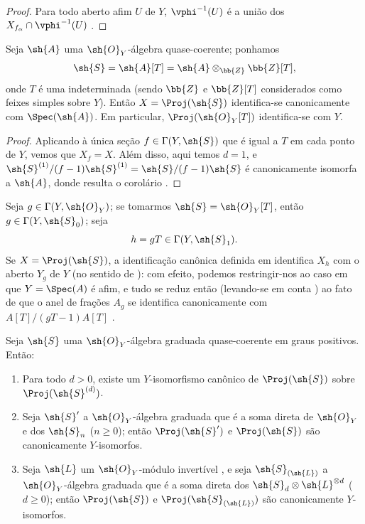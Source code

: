 \documentclass[oneside,10pt]{amsart}
\renewcommand{\geq}{\geqslant}
\newcommand{\oldpage}[2][]{\marginnote{\normalfont\footnotesize\textbf{#1}~|~#2}\ignorespaces}
\let\EGAOriginalLabel\label
\renewcommand{\label}[1]{\phantomsection\EGAOriginalLabel{#1}}
\begin{document}
\begin{proof}
Para todo aberto afim $U$ de $Y$, $\vphi^{-1}(U)$ é a união dos $X_{f_\alpha}\cap\vphi^{-1}(U)$ .
\end{proof}

\begin{corollary}[3.1.7]
\label{II.3.1.7}
Seja $\sh{A}$ uma $\sh{O}_Y$-álgebra quase-coerente;
ponhamos
\[
  \sh{S}=\sh{A}[T]=\sh{A}\otimes_{\bb{Z}}\bb{Z}[T],
\]
onde $T$ é uma indeterminada (sendo $\bb{Z}$ e $\bb{Z}[T]$ considerados como feixes simples sobre $Y$).
Então $X=\Proj(\sh{S})$ identifica-se canonicamente com $\Spec(\sh{A})$.
Em particular, $\Proj(\sh{O}_Y[T])$ identifica-se com $Y$.
\end{corollary}

\begin{proof}
Aplicando  à única seção $f\in\Gamma(Y,\sh{S})$ que é igual a $T$ em cada ponto de $Y$, vemos que $X_f=X$.
Além disso, aqui temos $d=1$, e $\sh{S}^{(1)}/(f-1)\sh{S}^{(1)}=\sh{S}/(f-1)\sh{S}$ é canonicamente isomorfa a $\sh{A}$, donde resulta o corolário .
\end{proof}

Seja $g\in\Gamma(Y,\sh{O}_Y)$;
se tomarmos $\sh{S}=\sh{O}_Y[T]$, então $g\in\Gamma(Y,\sh{S}_0)$;
seja
\[
  h=gT\in\Gamma(Y,\sh{S}_1).
\]
Se $X=\Proj(\sh{S})$, a identificação canônica definida em  identifica $X_h$ com o aberto $Y_g$ de $Y$ (no sentido de ):
com efeito, podemos restringir-nos ao caso em que $Y=\Spec(A)$ é afim, e tudo se reduz então (levando-se em conta ) ao fato de que o anel de frações $A_g$ se identifica canonicamente com $A[T]/(gT-1)A[T]$ .

\begin{proposition}[3.1.8]
\label{II.3.1.8}
Seja $\sh{S}$ uma $\sh{O}_Y$-álgebra graduada quase-coerente em graus positivos.
Então:
\begin{enumerate}
  \item[(i)] Para todo $d>0$, existe um $Y$-isomorfismo canônico de $\Proj(\sh{S})$ sobre $\Proj(\sh{S}^{(d)})$.
\oldpage[II]{52}
  \item[(ii)] Seja $\sh{S}'$ a $\sh{O}_Y$-álgebra graduada que é a soma direta de $\sh{O}_Y$ e dos $\sh{S}_n$ ($n\geq0$);
    então $\Proj(\sh{S}')$ e $\Proj(\sh{S})$ são canonicamente $Y$-isomorfos.
  \item[(iii)] Seja $\sh{L}$ um $\sh{O}_Y$-módulo invertível , e seja $\sh{S}_{(\sh{L})}$ a $\sh{O}_Y$-álgebra graduada que é a soma direta dos $\sh{S}_d\otimes\sh{L}^{\otimes d}$ ($d\geq0$);
    então $\Proj(\sh{S})$ e $\Proj(\sh{S}_{(\sh{L})})$ são canonicamente $Y$-isomorfos.
\end{enumerate}
\end{proposition}
\end{document}
